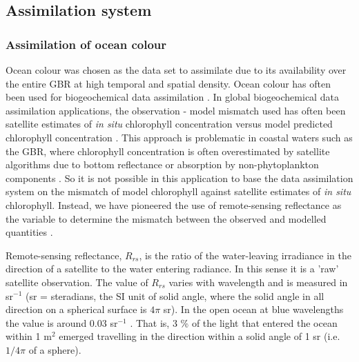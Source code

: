 \documentclass{elsart}
\begin{document}
\subsection{Assimilation system}

\subsubsection{Assimilation of ocean colour}

Ocean colour was chosen as the data set to assimilate due to its availability over the entire GBR at high temporal and spatial density. Ocean colour has often been used for biogeochemical data assimilation \citep{Kidston13}. In global biogeochemical data assimilation applications, the observation - model mismatch used has often been satellite estimates of \textit{in situ} chlorophyll concentration versus model predicted chlorophyll concentration \citep{Ford12}. This approach is problematic in coastal waters such as the GBR, where chlorophyll concentration is often overestimated by satellite algorithms due to bottom reflectance or absorption by non-phytoplankton components \citep{Schroeder12b}. So it is not possible in this application to base the data assimilation system on the mismatch of model chlorophyll against satellite estimates of \textit{in situ} chlorophyll. Instead, we have pioneered the use of remote-sensing reflectance as the variable to determine the mismatch between the observed and modelled quantities \citep{Jones16}. 

Remote-sensing reflectance, $R_{rs}$, is the ratio of the water-leaving irradiance in the direction of a satellite to the water entering radiance. In this sense it is a 'raw' satellite observation. The value of  $R_{rs}$ varies with wavelength and is measured in sr$^{-1}$ (sr = steradians, the SI unit of solid angle, where the solid angle in all direction on a spherical surface is $4 \pi$ sr). In the open ocean at blue wavelengths the value is around 0.03 sr$^{-1}$ \citep{Baird16a}. That is, 3 \% of the light that entered the ocean within 1 m$^{2}$ emerged travelling in the direction within a solid angle of 1 sr (i.e. $1 / 4 \pi$ of a sphere).
\end{document}

